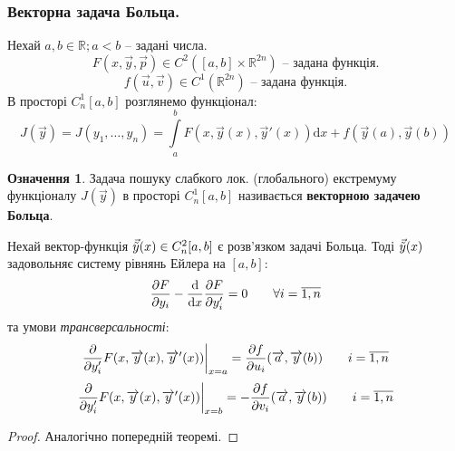 \documentclass[14pt,a4paper]{scrartcl}
\theoremstyle{definition}
\newtheorem*{defo}{Означення}
\theoremstyle{definition}
\theoremstyle{definition}
\begin{document}
\subsubsection{Векторна задача Больца.}
Нехай $a,b \in \mathbb{R}; a<b$ -- задані числа.
$$
F(x,\overrightarrow{y}, \overrightarrow{p}) \in C^2([a,b]\times \mathbb{R}^{2n}) \text{ -- задана функція.}
$$
$$
f(\overrightarrow{u}, \overrightarrow{v})\in C^1(\mathbb{R}^{2n}) \text{ -- задана функція.}
$$
В просторі $C_n^1[a,b]$ розглянемо функціонал:
$$
J(\overrightarrow{y}) = J(y_1, \dots , y_n) =  \int\limits_{a}^{b}{ F(x, \overrightarrow{y}(x), \overrightarrow{y}'(x))} \mathrm{d} x + f(\overrightarrow{y}(a), \overrightarrow{y}(b))
$$
\begin{defo}
 Задача пошуку слабкого лок. (глобального) екстремуму функціоналу $J(\overrightarrow{y})$ в просторі $C_n^1 [a,b]$ називається \textbf{ векторною задачею Больца}.
\end{defo}
\begin{boxteo}
 Нехай вектор-функція $\vec{\tilde{y}} (x) \in C_n^2 [a,b]$ є розв'язком задачі Больца. Тоді $\vec{\tilde{y}} (x)$ задовольняє систему рівнянь Ейлера на $[a,b]$:
 $$
 \frac{\partial F}{\partial y_i} - \frac{\mathrm{d}}{ \mathrm{d} x} \frac{\partial F}{\partial y_i'}  = 0 \qquad \forall i = \overline{1, n}
 $$
 та умови \textit{трансверсальності}:
 $$
 \frac{\partial}{\partial y_i'} F(x, \overrightarrow{y}(x),  \overrightarrow{y}'(x))\bigg|_{x =a} = \frac{\partial f}{\partial u_i} (\overrightarrow{a}, \overrightarrow{y}(b)) \qquad i = \overline{1,n}
 $$
 $$
  \frac{\partial}{\partial y_i'} F(x, \overrightarrow{y}(x),  \overrightarrow{y}'(x))\bigg|_{x =b} =- \frac{\partial f}{\partial v_i} (\overrightarrow{a}, \overrightarrow{y}(b)) \qquad i = \overline{1,n}
 $$
 \begin{proof}
  Аналогічно попередній теоремі.
 \end{proof}
\end{boxteo}
\newpage
 
\end{document}
